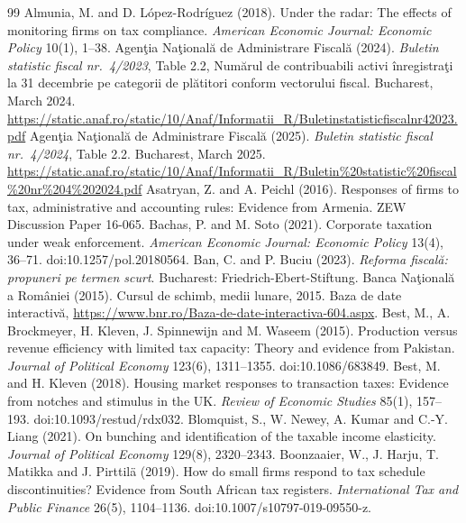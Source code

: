 \documentclass[12pt]{article}
\begin{document}

\begin{thebibliography}{99}
 Almunia, M. and D. L\'opez-Rodr\'iguez (2018). Under the radar: The effects of monitoring firms on tax compliance. \emph{American Economic Journal: Economic Policy} 10(1), 1--38.
 Agen\c{t}ia Na\c{t}ional\u{a} de Administrare Fiscal\u{a} (2024). \emph{Buletin statistic fiscal nr.\ 4/2023}, Table 2.2, Num\u{a}rul de contribuabili activi \^{i}nregistra\c{t}i la 31 decembrie pe categorii de pl\u{a}titori conform vectorului fiscal. Bucharest, March 2024. \url{https://static.anaf.ro/static/10/Anaf/Informatii_R/Buletinstatisticfiscalnr42023.pdf}
 Agen\c{t}ia Na\c{t}ional\u{a} de Administrare Fiscal\u{a} (2025). \emph{Buletin statistic fiscal nr.\ 4/2024}, Table 2.2. Bucharest, March 2025. \url{https://static.anaf.ro/static/10/Anaf/Informatii_R/Buletin%20statistic%20fiscal%20nr%204%202024.pdf}
 Asatryan, Z. and A. Peichl (2016). Responses of firms to tax, administrative and accounting rules: Evidence from Armenia. ZEW Discussion Paper 16-065.
 Bachas, P. and M. Soto (2021). Corporate taxation under weak enforcement. \emph{American Economic Journal: Economic Policy} 13(4), 36--71. doi:10.1257/pol.20180564.
 Ban, C. and P. Buciu (2023). \emph{Reforma fiscal\u{a}: propuneri pe termen scurt}. Bucharest: Friedrich-Ebert-Stiftung.
 Banca Na\c{t}ional\u{a} a Rom\^{a}niei (2015). Cursul de schimb, medii lunare, 2015. Baza de date interactiv\u{a}, \url{https://www.bnr.ro/Baza-de-date-interactiva-604.aspx}.
 Best, M., A. Brockmeyer, H. Kleven, J. Spinnewijn and M. Waseem (2015). Production versus revenue efficiency with limited tax capacity: Theory and evidence from Pakistan. \emph{Journal of Political Economy} 123(6), 1311--1355. doi:10.1086/683849.
 Best, M. and H. Kleven (2018). Housing market responses to transaction taxes: Evidence from notches and stimulus in the UK. \emph{Review of Economic Studies} 85(1), 157--193. doi:10.1093/restud/rdx032.
 Blomquist, S., W. Newey, A. Kumar and C.-Y. Liang (2021). On bunching and identification of the taxable income elasticity. \emph{Journal of Political Economy} 129(8), 2320--2343.
 Boonzaaier, W., J. Harju, T. Matikka and J. Pirttil\"a (2019). How do small firms respond to tax schedule discontinuities? Evidence from South African tax registers. \emph{International Tax and Public Finance} 26(5), 1104--1136. doi:10.1007/s10797-019-09550-z.

\end{thebibliography}
\end{document}

